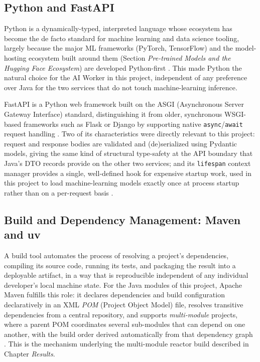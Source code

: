 \documentclass[twoside]{supsistudent}
\begin{document}
\subsection{Python and FastAPI}
Python is a dynamically-typed, interpreted language whose ecosystem has become the de facto standard for machine learning and data science tooling, largely because the major ML frameworks (PyTorch, TensorFlow) and the model-hosting ecosystem built around them (Section \emph{Pre-trained Models and the Hugging Face Ecosystem}) are developed Python-first \cite{millman2011python, paszke2019pytorch}. This made Python the natural choice for the AI Worker in this project, independent of any preference over Java for the two services that do not touch machine-learning inference.

FastAPI is a Python web framework built on the ASGI (Asynchronous Server Gateway Interface) standard, distinguishing it from older, synchronous WSGI-based frameworks such as Flask or Django by supporting native \texttt{async}/\texttt{await} request handling \cite{asgi2019, alaanzy2026asgi}. Two of its characteristics were directly relevant to this project: request and response bodies are validated and (de)serialized using Pydantic models, giving the same kind of structural type-safety at the API boundary that Java's DTO records provide on the other two services; and its \texttt{lifespan} context manager provides a single, well-defined hook for expensive startup work, used in this project to load machine-learning models exactly once at process startup rather than on a per-request basis \cite{asgi2019}.

\subsection{Build and Dependency Management: Maven and uv}
A build tool automates the process of resolving a project's dependencies, compiling its source code, running its tests, and packaging the result into a deployable artifact, in a way that is reproducible independent of any individual developer's local machine state. For the Java modules of this project, Apache Maven fulfills this role: it declares dependencies and build configuration declaratively in an XML \emph{POM} (Project Object Model) file, resolves transitive dependencies from a central repository, and supports \emph{multi-module} projects, where a parent POM coordinates several sub-modules that can depend on one another, with the build order derived automatically from that dependency graph \cite{obrien2008maven, benelallam2019maven}. This is the mechanism underlying the multi-module reactor build described in Chapter \emph{Results}.
\end{document}
